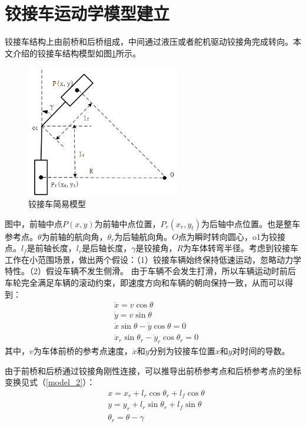 \documentclass[master,academic]{ysuthesis} %
\begin{document}
	\section{铰接车运动学模型建立}
	铰接车结构上由前桥和后桥组成，中间通过液压或者舵机驱动铰接角完成转向。本文介绍的铰接车结构模型如图\ref{fig:铰接车简易模型}所示。 
	\begin{figure}[H]
		\centering
		\includegraphics[width=0.6\textwidth]{铰接车简易模型.png}
		\caption{铰接车简易模型}
		\label{fig:铰接车简易模型}
	\end{figure}

	图中，前轴中点$P(x,y)$为前轴中点位置，$P_r(x_r,y_t)$为后轴中点位置。也是整车参考点。$\theta$为前轴的航向角，$\theta_r$为后轴航向角。$O$点为瞬时转向圆心，o1为铰接点。$l_f$是前轴长度，$l_r$是后轴长度，$\gamma$是铰接角，$R$为车体转弯半径。考虑到铰接车工作在小范围场景，做出两个假设：（1）铰接车辆始终保持低速运动，忽略动力学特性。（2）假设车辆不发生侧滑。
	由于车辆不会发生打滑，所以车辆运动时前后车轮完全满足车辆的滚动约束，即速度方向和车辆的朝向保持一致，从而可以得到：
	\begin{equation}
		\begin{aligned}
			&\dot{x}=v\cos\theta\\
			&\dot{y}=v\sin\theta\\
			&\dot{x}\sin\theta-\dot{y}\cos\theta=0\\
			&\dot{x}_r\sin\theta _r-\dot{y}_r\cos\theta _r=0
		\end{aligned}
		\label{model_1}
	\end{equation}
	其中，$v$为车体前桥的参考点速度，$\dot{x}$和$\dot{y}$分别为铰接车位置$x$和$y$对时间的导数。

	由于前桥和后桥通过铰接角刚性连接，可以推导出前桥参考点和后桥参考点的坐标变换见式（\ref{model_2}）：
	\begin{equation}
		\begin{aligned}
			&x=x_r+l_r\cos\theta _r+l_f\cos\theta\\
			&y=y_r+l_r\sin\theta _r+l_f\sin\theta\\
			&\theta _r=\theta-\gamma 
		\end{aligned}
		\label{model_2}
	\end{equation}
\end{document}
